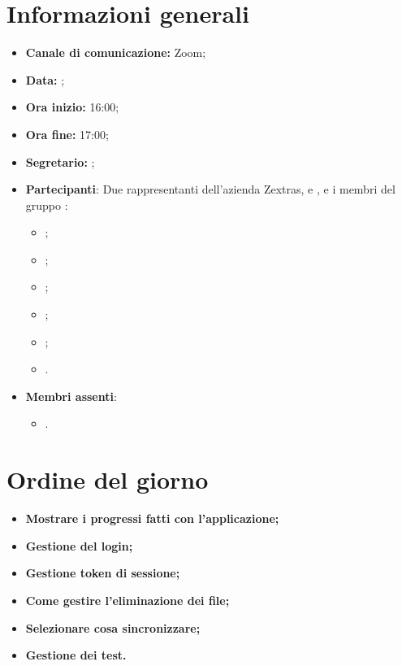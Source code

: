 \section{Informazioni generali}

\begin{itemize}

    \item \textbf{Canale di comunicazione:} Zoom;

    \item \textbf{Data:} \DataMeeting{};

    \item \textbf{Ora inizio:} 16:00;

    \item \textbf{Ora fine:} 17:00;

    \item \textbf{Segretario:} \ACapoRedazione{};

    \item \textbf{Partecipanti}: Due rappresentanti dell'azienda Zextras, \Alessio{} e \Federico{}, e i membri del gruppo \Gruppo{}:
        \begin{itemize}
            \item \Daniele{};
            \item \Davide{};
            \item \Francesco{};
            \item \Giosue{};
            \item \Lucrezia{};
            \item \Matteo{}.
        \end{itemize}
    \item \textbf{Membri assenti}:
        \begin{itemize}
            \item \Tommaso{}.
        \end{itemize}
\end{itemize}

\section{Ordine del giorno}

\begin{itemize}
    \item\textbf{Mostrare i progressi fatti con l'applicazione;}
    \item\textbf{Gestione del login;}
    \item\textbf{Gestione token di sessione;}
    \item\textbf{Come gestire l'eliminazione dei file;}
    \item\textbf{Selezionare cosa sincronizzare;}
    \item\textbf{Gestione dei test.}
\end{itemize}
\newpage


